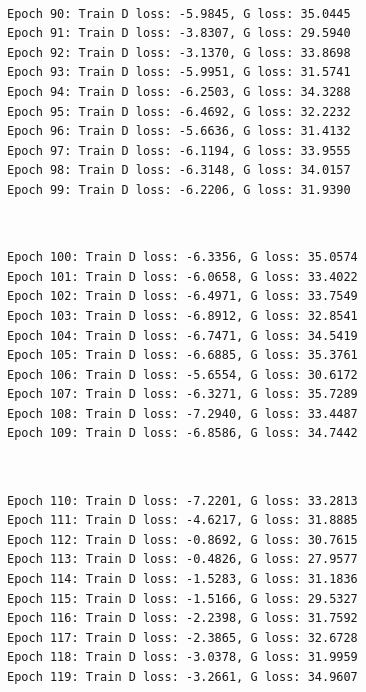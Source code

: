 \documentclass[11pt]{article}
\begin{document}
    \begin{center}
    \end{center}
    { \hspace*{\fill} \\}
    
    \begin{Verbatim}[commandchars=\\\{\}]
Epoch 90: Train D loss: -5.9845, G loss: 35.0445
Epoch 91: Train D loss: -3.8307, G loss: 29.5940
Epoch 92: Train D loss: -3.1370, G loss: 33.8698
Epoch 93: Train D loss: -5.9951, G loss: 31.5741
Epoch 94: Train D loss: -6.2503, G loss: 34.3288
Epoch 95: Train D loss: -6.4692, G loss: 32.2232
Epoch 96: Train D loss: -5.6636, G loss: 31.4132
Epoch 97: Train D loss: -6.1194, G loss: 33.9555
Epoch 98: Train D loss: -6.3148, G loss: 34.0157
Epoch 99: Train D loss: -6.2206, G loss: 31.9390

    \end{Verbatim}

    \begin{center}
    \end{center}
    { \hspace*{\fill} \\}
    
    \begin{Verbatim}[commandchars=\\\{\}]
Epoch 100: Train D loss: -6.3356, G loss: 35.0574
Epoch 101: Train D loss: -6.0658, G loss: 33.4022
Epoch 102: Train D loss: -6.4971, G loss: 33.7549
Epoch 103: Train D loss: -6.8912, G loss: 32.8541
Epoch 104: Train D loss: -6.7471, G loss: 34.5419
Epoch 105: Train D loss: -6.6885, G loss: 35.3761
Epoch 106: Train D loss: -5.6554, G loss: 30.6172
Epoch 107: Train D loss: -6.3271, G loss: 35.7289
Epoch 108: Train D loss: -7.2940, G loss: 33.4487
Epoch 109: Train D loss: -6.8586, G loss: 34.7442

    \end{Verbatim}

    \begin{center}
    \end{center}
    { \hspace*{\fill} \\}
    
    \begin{Verbatim}[commandchars=\\\{\}]
Epoch 110: Train D loss: -7.2201, G loss: 33.2813
Epoch 111: Train D loss: -4.6217, G loss: 31.8885
Epoch 112: Train D loss: -0.8692, G loss: 30.7615
Epoch 113: Train D loss: -0.4826, G loss: 27.9577
Epoch 114: Train D loss: -1.5283, G loss: 31.1836
Epoch 115: Train D loss: -1.5166, G loss: 29.5327
Epoch 116: Train D loss: -2.2398, G loss: 31.7592
Epoch 117: Train D loss: -2.3865, G loss: 32.6728
Epoch 118: Train D loss: -3.0378, G loss: 31.9959
Epoch 119: Train D loss: -3.2661, G loss: 34.9607

    \end{Verbatim}
\end{document}
